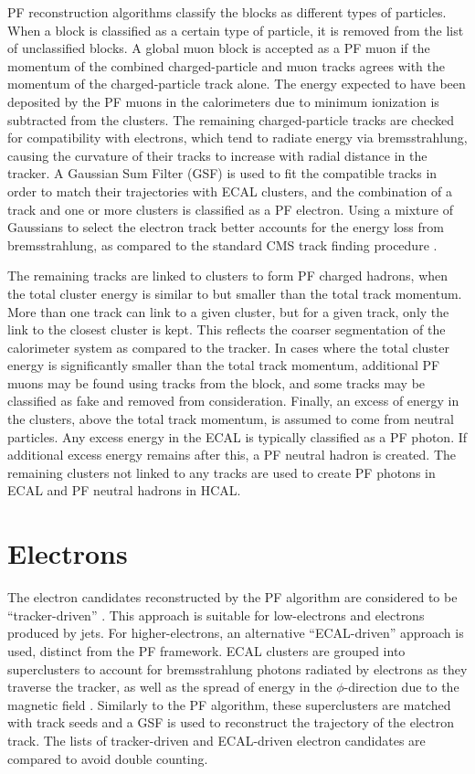\documentclass[12pt]{thesis}  %
\begin{document}
PF reconstruction algorithms classify the blocks as different types of particles. When a block is classified as a certain type of particle, it is removed from the list of unclassified blocks. A global muon block is accepted as a PF muon if the momentum of the combined charged-particle and muon tracks agrees with the momentum of the charged-particle track alone. The energy expected to have been deposited by the PF muons in the calorimeters due to minimum ionization is subtracted from the clusters. The remaining charged-particle tracks are checked for compatibility with electrons, which tend to radiate energy via bremsstrahlung, causing the curvature of their tracks to increase with radial distance in the tracker. A Gaussian Sum Filter (GSF) is used to fit the compatible tracks in order to match their trajectories with ECAL clusters, and the combination of a track and one or more clusters is classified as a PF electron. Using a mixture of Gaussians to select the electron track better accounts for the energy loss from bremsstrahlung, as compared to the standard CMS track finding procedure \cite{ElectronGSF}.

The remaining tracks are linked to clusters to form PF charged hadrons, when the total cluster energy is similar to but smaller than the total track momentum. More than one track can link to a given cluster, but for a given track, only the link to the closest cluster is kept. This reflects the coarser segmentation of the calorimeter system as compared to the tracker. In cases where the total cluster energy is significantly smaller than the total track momentum, additional PF muons may be found using tracks from the block, and some tracks may be classified as fake and removed from consideration. Finally, an excess of energy in the clusters, above the total track momentum, is assumed to come from neutral particles. Any excess energy in the ECAL is typically classified as a PF photon. If additional excess energy remains after this, a PF neutral hadron is created. The remaining clusters not linked to any tracks are used to create PF photons in ECAL and PF neutral hadrons in HCAL.

\section{Electrons
\label{sec:ele-reco}}

The electron candidates reconstructed by the PF algorithm are considered to be ``tracker-driven'' \cite{CMS-PAS-EGM-10-004}. This approach is suitable for low-\pt electrons and electrons produced by jets. For higher-\pt electrons, an alternative ``ECAL-driven'' approach is used, distinct from the PF framework. ECAL clusters are grouped into superclusters to account for bremsstrahlung photons radiated by electrons as they traverse the tracker, as well as the spread of energy in the $\phi$-direction due to the magnetic field \cite{ElectronReco}. Similarly to the PF algorithm, these superclusters are matched with track seeds and a GSF is used to reconstruct the trajectory of the electron track. The lists of tracker-driven and ECAL-driven electron candidates are compared to avoid double counting.
\end{document}
